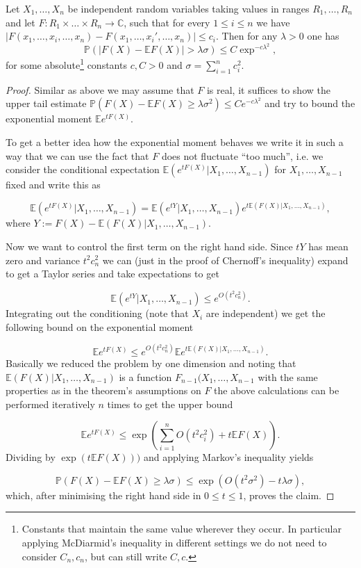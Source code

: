 \begin{theorem}
	Let $X_1,\dots,X_n$ be independent random variables taking values in ranges $R_1,\dots,R_n$ and let $F:R_1\times\dots\times R_n\rightarrow\mathbb C$, such that for every $1\leq i\leq n$ we have $|F(x_1,\dots,x_i,\dots,x_n)-F(x_1,\dots,x_i',\dots,x_n)|\leq c_i$. Then for any $\lambda>0$ one has $$\mathbb P(|F(X)-\mathbb EF(X)|>\lambda\sigma)\leq C\exp^{-c\lambda^2},$$ for some absolute\footnote{Constants that maintain the same value wherever they occur. In particular applying McDiarmid's inequality in different settings we do not need to consider $C_n, c_n$, but can still write $C,c$.} constants $c,C>0$ and $\sigma=\sum_{i=1}^n c_i^2$.
\end{theorem}

\begin{proof}
	Similar as above we may assume that $F$ is real, it suffices to show the upper tail estimate $\mathbb P(F(X)-\mathbb EF(X)\geq\lambda\sigma^2)\leq Ce^{-c\lambda^2}$ and try to bound the exponential moment $\mathbb Ee^{tF(X)}$.
	
	To get a better idea how the exponential moment behaves we write it in such a way that we can use the fact that $F$ does not fluctuate ``too much'', i.e. we consider the conditional expectation $\mathbb E(e^{tF(X)}|X_1,\dots,X_{n-1})$ for $X_1,\dots,X_{n-1}$ fixed and write this as
	
	$$\mathbb E(e^{tF(X)}|X_1,\dots,X_{n-1}) = \mathbb E(e^{tY}|X_1,\dots,X_{n-1})e^{t\mathbb E(F(X)|X_1,\dots,X_{n-1})},$$
	where $Y:=F(X)-\mathbb E(F(X)|X_1,\dots,X_{n-1})$.
	
	Now we want to control the first term on the right hand side.
	Since $tY$ has mean zero and variance $t^2c_n^2$ we can (just in the proof of Chernoff's inequality) expand to get a Taylor series and take expectations to get
	
	$$\mathbb E(e^{tY}|X_1,\dots,X_{n-1}) \leq e^{O(t^2c_n^2)}.$$
	Integrating out the conditioning (note that $X_i$ are independent) we get the following bound on the exponential moment
	
	$$\mathbb Ee^{tF(X)} \leq e^{O(t^2c_n^2)}\mathbb E e^{t\mathbb E(F(X)|X_1,\dots,X_{n-1})}.$$
	Basically we reduced the problem by one dimension and noting that \newline$\mathbb E(F(X)|X_1,\dots,X_{n-1})$ is a function $F_{n-1}(X_1,\dots,X_{n-1}$ with the same properties as in the theorem's assumptions on $F$ the above calculations can be performed iteratively $n$ times to get the upper bound
	
	$$\mathbb Ee^{tF(X)}\leq \exp(\sum_{i=1}^n O(t^2c_i^2) + t\mathbb EF(X)).$$
	Dividing by $\exp(t\mathbb EF(X)))$ and applying Markov's inequality yields
	
	$$\mathbb P(F(X)-\mathbb EF(X)\geq\lambda\sigma) \leq \exp(O(t^2\sigma^2)-t\lambda\sigma),$$
	which, after minimising the right hand side in $0\leq t\leq 1$, proves the claim.
\end{proof}


